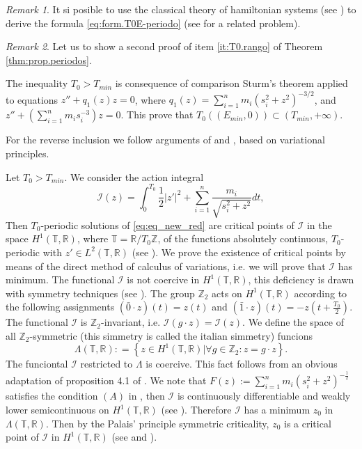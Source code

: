 \documentclass[twoside]{article}
\theoremstyle{remark}
\newtheorem{comentario}{Remark}
\newcommand{\rr}{\mathbb{R}}
\begin{document}
\begin{comentario}
 It si posible to use the classical theory of hamiltonian systems (see \cite{A}) to derive the formula \eqref{eq:form.T0E-periodo} (see \cite{acinas2014estimates} for a related problem).
\end{comentario}



\begin{comentario}
Let us to show a second proof of item \ref{it:T0.rango} of Theorem \ref{thm:prop.periodos}.

The inequality $T_0>T_{min}$ is consequence of comparison Sturm's theorem applied to equations  $z''+q_1(z)z=0$, where $q_1(z)=\sum_{i=1}^{n} m_i \left(s_i^2 +z^2\right)^{-3/2}$, and $z''+\left(\sum_{i=1}^{n} m_i s_i^{-3}\right)z=0$. This prove that $T_0\left((E_{min},0)\right)\subset(T_{min},+\infty)$.

For the reverse inclusion  we  follow arguments of \cite{zhao2015nonplanar} and \cite{li2013characterization}, based on variational principles.


Let $T_0>T_{min}$. We consider the action integral
\[\mathcal{I}(z)=\int_0^{T_0}\frac12|z'|^2+\sum_{i=1}^n\frac{m_i}{\sqrt{s_i^2+z^2}}dt,\]
Then $T_0$-periodic solutions of \eqref{eq:eq_new_red} are critical points of $\mathcal{I}$ in the space $H^1(\mathbb{T},\rr)$, where $\mathbb{T}=\rr/T_0\mathbb{Z}$, of the functions  absolutely continuous, $T_0$-periodic with $z'\in L^2(\mathbb{T},\rr)$ (see \cite[Cor. 1.1]{Mawhin2010}). We prove the existence of critical points by means of the direct method of calculus of variations, i.e. we will prove that $\mathcal{I}$ has minimum.  The functional $\mathcal{I}$ is not coercive in $H^1(\mathbb{T},\rr)$,  this deficiency is drawn with symmetry techniques (see \cite{David-2004}). The group $\mathbb{Z}_2$ acts on $H^1(\mathbb{T},\rr)$ according to the following assignments $(\bar{0}\cdot z)(t)=z(t)$ and $(\bar{1}\cdot z)(t)=-z(t+\frac{T_0}{2})$. The functional $\mathcal{I}$ is $\mathbb{Z}_2$-invariant, i.e. $\mathcal{I}(g\cdot z)=\mathcal{I}(z)$. We define the space of all $\mathbb{Z}_2$-symmetric (this simmetry is called the italian simmetry) funcions \[\Lambda(\mathbb{T},\mathbb{R}):
=\left\{ z\in H^1(\mathbb{T},\rr) | \forall g\in \mathbb{Z}_2 : z=g\cdot z \right\}.\]
The funciontal $\mathcal{I}$ restricted to $\Lambda$  is coercive. This fact follows from an obvious adaptation of proposition 4.1 of \cite{David-2004}. We note that $F(z):=\sum_{i=1}^nm_i(s_i^2+z^2)^{-\frac{1}{2}}$ satisfies the condition $(A)$ in \cite[p. 12]{Mawhin2010}, then $\mathcal{I}$  is continuously differentiable and weakly lower semicontinuous on $H^1(\mathbb{T},\rr)$ (see \cite[p. 13]{Mawhin2010}). Therefore $\mathcal{I}$ has a minimum $z_0$ in $\Lambda(\mathbb{T},\mathbb{R})$. Then by the Palais' principle symmetric criticality,  $z_0$ is a critical point of $\mathcal{I}$ in $H^1(\mathbb{T},\rr)$ (see \cite{David-2004} and \cite{RichardPalais274}).


\end{comentario}
\end{document}
